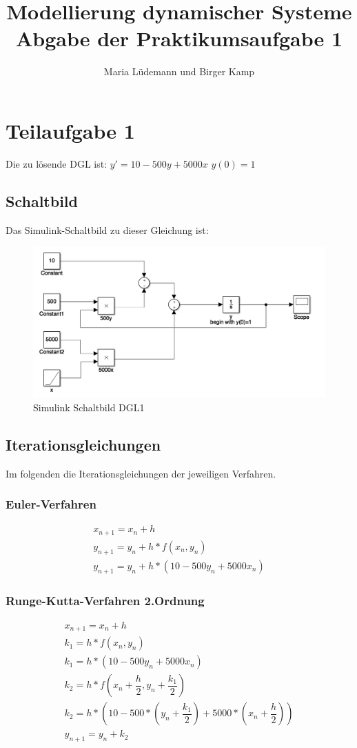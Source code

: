 \documentclass[]{scrartcl}
\title{Modellierung dynamischer Systeme  \\ Abgabe der Praktikumsaufgabe 1}
\author{Maria Lüdemann und Birger Kamp}
\begin{document}
\maketitle

\begin{abstract}

\end{abstract}

\section{Teilaufgabe 1}
Die zu lösende DGL ist:
$ y' = 10 - 500y + 5000x $
$ y(0) = 1 $

\subsection*{Schaltbild}
Das Simulink-Schaltbild zu dieser Gleichung ist:

\begin{figure}[htbp]
\centering
\includegraphics[width=0.7\linewidth]{a1_1_Schaltbild}
\caption{Simulink Schaltbild DGL1}
\label{fig:A1_1_Schaltbild}
\end{figure}

\subsection*{Iterationsgleichungen}
Im folgenden die Iterationsgleichungen der jeweiligen Verfahren.

\subsubsection*{Euler-Verfahren}
\begin{align}
x_{n+1} = x_{n}+h \\
y_{n+1} = y_{n}+h*f(x_{n},y_{n}) \\
y_{n+1} = y_{n}+h*(10-500y_{n}+5000x_{n})
\end{align}

\subsubsection*{Runge-Kutta-Verfahren 2.Ordnung}
\begin{align}
x_{n+1} = x_{n}+h \\
k_{1} = h*f(x_{n},y_{n}) \\
k_{1} = h*(10-500y_{n}+5000x_{n}) \\
k_{2} = h*f(x_{n} + \dfrac{h}{2},y_{n} + \dfrac{k_{1}}{2}) \\
k_{2} = h*(10-500*(y_{n} + \dfrac{k_{1}}{2})+5000*(x_{n} + \dfrac{h}{2})) \\
y_{n+1} = y_{n}+k_{2}
\end{align}
\end{document}
